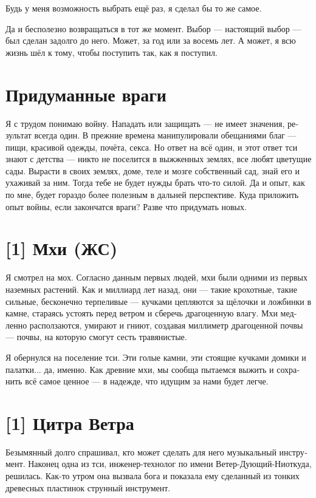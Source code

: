 \documentclass[a4paper,12pt,fleqn]{book}\usepackage{polyglossia}\setdefaultlanguage[babelshorthands=true]{russian}\setotherlanguage{english}\defaultfontfeatures{Ligatures=TeX,Mapping=tex-text}\usepackage{xcolor}\newcommand{\ml}[3]{#2}
\begin{document}
{Будь у меня возможность выбрать ещё раз, я сделал бы то же самое.

Да и бесполезно возвращаться в тот же момент.
Выбор --- настоящий выбор --- был сделан задолго до него.
Может, за год или за восемь лет.
А может, я всю жизнь шёл к тому, чтобы поступить так, как я поступил.

\section{Придуманные враги}

Я с трудом понимаю войну.
Нападать или защищать --- не имеет значения, результат всегда один.
В прежние времена манипулировали обещаниями благ --- пищи, красивой одежды, почёта, секса.
Но ответ на всё один, и этот ответ тси знают с детства --- никто не поселится в выжженных землях, все любят цветущие сады.
Вырасти в своих землях, доме, теле и мозге собственный сад, знай его и ухаживай за ним.
Тогда тебе не будет нужды брать что-то силой.
Да и опыт, как по мне, будет гораздо более полезным в дальней перспективе.
Куда приложить опыт войны, если закончатся враги?
Разве что придумать новых.

\section{[1] Мхи (ЖС)}

Я смотрел на мох.
Согласно данным первых людей, мхи были одними из первых наземных растений.
Как и миллиард лет назад, они --- такие крохотные, такие сильные, бесконечно терпеливые --- кучками цепляются за щёлочки и ложбинки в камне, стараясь устоять перед ветром и сберечь драгоценную влагу.
Мхи медленно расползаются, умирают и гниют, создавая миллиметр драгоценной почвы --- почвы, на которую смогут сесть травянистые.

Я обернулся на поселение тси.
Эти голые камни, эти стоящие кучками домики и палатки... да, именно.
Как древние мхи, мы сообща пытаемся выжить и сохранить всё самое ценное --- в надежде, что идущим за нами будет легче.

\section{[1] Цитра Ветра}

Безымянный долго спрашивал, кто может сделать для него музыкальный инструмент.
Наконец одна из тси, инженер-технолог по имени Ветер-Дующий-Ниоткуда, решилась.
Как-то утром она вызвала бога и показала ему сделанный из тонких древесных пластинок струнный инструмент.

}
\end{document}
